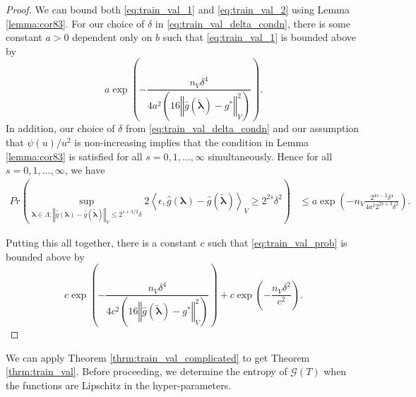 \documentclass[10pt]{book}
\theoremstyle{definition}
\begin{document}
\begin{proof}
	We can bound both \eqref{eq:train_val_1} and \eqref{eq:train_val_2} using Lemma \ref{lemma:cor83}. For our choice of $\delta$ in \eqref{eq:train_val_delta_condn},
	there is some constant $a>0$ dependent only on $b$ such that \eqref{eq:train_val_1} is bounded above by
	\[ 
	a\exp\left(-\frac{n_{V}\delta^{4}}{4a^{2}\left(16\left\Vert \hat{g}(\tilde{\boldsymbol{\lambda}})-g^{*}\right\Vert _{V}^{2}\right)}\right).
	\]
	In addition, our choice of $\delta$ from \eqref{eq:train_val_delta_condn} and our assumption that $\psi(u)/u^2$ is non-increasing implies that the condition in Lemma \ref{lemma:cor83} is satisfied for all $s=0,1,...,\infty$ simultaneously. Hence for all $s=0,1,...,\infty$, we have
	\begin{align}
	Pr\left(
	\sup_{\boldsymbol{\lambda} \in \Lambda: \left\Vert \hat{g}({\boldsymbol{\lambda}})-\hat{g}(\tilde{\boldsymbol{\lambda}})\right\Vert _{V}
		\le
		2^{s+3/2}\delta}
	2\left\langle \epsilon,\hat{g}({\boldsymbol{\lambda}})-\hat{g}(\tilde{\boldsymbol{\lambda}})\right\rangle _{V}
	\ge
	2^{2s} \delta^{2}
	\right)
	& \le 
	a\exp\left(-n_{V}\frac{2^{4s-2}\delta^{4}}{4a^{2}2^{2s+3}\delta^{2}}\right).
	\end{align}
	
	Putting this all together, there is a constant $c$ such that \eqref{eq:train_val_prob} is bounded above by
	\begin{equation}
	c\exp\left(-\frac{n_{V}\delta^{4}}{4 c^{2}\left(16\left\Vert \hat{g}(\tilde{\boldsymbol{\lambda}})-g^{*}\right\Vert _{V}^{2}\right)}\right)
	+
	c\exp\left(-\frac{n_{V} \delta^2}{c^{2}}\right).
	\end{equation}
	
\end{proof}

We can apply Theorem \ref{thrm:train_val_complicated} to get Theorem \ref{thrm:train_val}. Before proceeding, we determine the entropy of $\mathcal{G}(T)$ when the functions are Lipschitz in the hyper-parameters.
\end{document}
